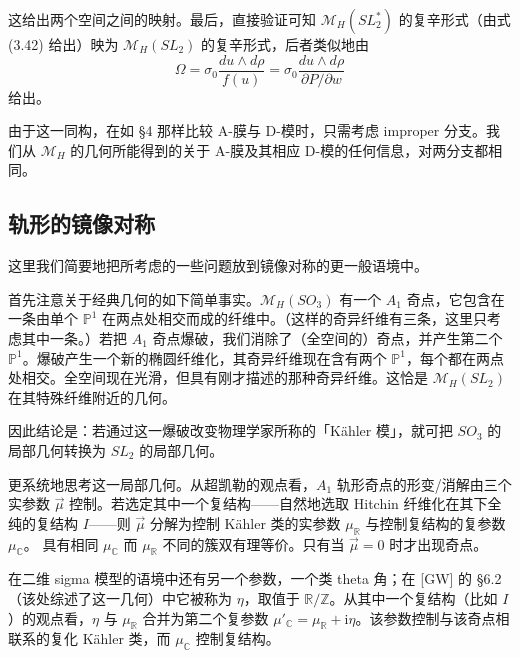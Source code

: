 \documentclass[11pt,a4paper]{article}
\begin{document}
这给出两个空间之间的映射。最后，直接验证可知 $\mathcal{M}_H(SL_2^*)$ 的复辛形式（由式 (3.42) 给出）映为 $\mathcal{M}_H(SL_2)$ 的复辛形式，后者类似地由
\begin{equation}\tag{3.57}
\Omega=\sigma_0\frac{du\wedge d\rho}{f(u)}=\sigma_0\frac{du\wedge d\rho}{\partial P/\partial w}
\end{equation}
给出。

由于这一同构，在如 §4 那样比较 A-膜与 D-模时，只需考虑 improper 分支。我们从 $\mathcal{M}_H$ 的几何所能得到的关于 A-膜及其相应 D-模的任何信息，对两分支都相同。

\subsection{轨形的镜像对称}

这里我们简要地把所考虑的一些问题放到镜像对称的更一般语境中。

首先注意关于经典几何的如下简单事实。$\mathcal{M}_H(SO_3)$ 有一个 $A_1$ 奇点，它包含在一条由单个 $\mathbb{P}^1$ 在两点处相交而成的纤维中。（这样的奇异纤维有三条，这里只考虑其中一条。）若把 $A_1$ 奇点爆破，我们消除了（全空间的）奇点，并产生第二个 $\mathbb{P}^1$。爆破产生一个新的椭圆纤维化，其奇异纤维现在含有两个 $\mathbb{P}^1$，每个都在两点处相交。全空间现在光滑，但具有刚才描述的那种奇异纤维。这恰是 $\mathcal{M}_H(SL_2)$ 在其特殊纤维附近的几何。

因此结论是：若通过这一爆破改变物理学家所称的「Kähler 模」，就可把 $SO_3$ 的局部几何转换为 $SL_2$ 的局部几何。

更系统地思考这一局部几何。从超凯勒的观点看，$A_1$ 轨形奇点的形变/消解由三个实参数 $\vec\mu$ 控制。若选定其中一个复结构——自然地选取 Hitchin 纤维化在其下全纯的复结构 $I$——则 $\vec\mu$ 分解为控制 Kähler 类的实参数 $\mu_{\mathbb{R}}$ 与控制复结构的复参数 $\mu_{\mathbb{C}}$。
具有相同 $\mu_{\mathbb{C}}$ 而 $\mu_{\mathbb{R}}$ 不同的簇双有理等价。只有当 $\vec\mu=0$ 时才出现奇点。

在二维 sigma 模型的语境中还有另一个参数，一个类 theta 角；在 [GW] 的 §6.2（该处综述了这一几何）中它被称为 $\eta$，取值于 $\mathbb{R}/\mathbb{Z}$。从其中一个复结构（比如 $I$）的观点看，$\eta$ 与 $\mu_{\mathbb{R}}$ 合并为第二个复参数 $\mu'_{\mathbb{C}}=\mu_{\mathbb{R}}+\mathrm{i}\eta$。该参数控制与该奇点相联系的复化 Kähler 类，而 $\mu_{\mathbb{C}}$ 控制复结构。
\end{document}
